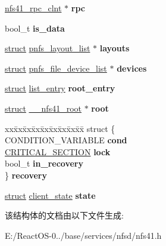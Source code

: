 \begin{DoxyCompactItemize}
\item 
\mbox{\label{struct____nfs41__client_a2b2d41615b81803ffdd4c105c84af7e6}} 
\hyperlink{struct____nfs41__rpc__clnt}{nfs41\+\_\+rpc\+\_\+clnt} $\ast$ {\bfseries rpc}
\item 
\mbox{\label{struct____nfs41__client_a7604f9288603a0123989c94c1efa1b97}} 
bool\+\_\+t {\bfseries is\+\_\+data}
\item 
\mbox{\label{struct____nfs41__client_ae9c265acfc3264bcb6ba53b9feccf64b}} 
\hyperlink{interfacestruct}{struct} \hyperlink{structpnfs__layout__list}{pnfs\+\_\+layout\+\_\+list} $\ast$ {\bfseries layouts}
\item 
\mbox{\label{struct____nfs41__client_a69a55cc04ccb6bcc3cfc9d58a0172e68}} 
\hyperlink{interfacestruct}{struct} \hyperlink{structpnfs__file__device__list}{pnfs\+\_\+file\+\_\+device\+\_\+list} $\ast$ {\bfseries devices}
\item 
\mbox{\label{struct____nfs41__client_a833a0b32460f73898c5a579d226e7938}} 
\hyperlink{interfacestruct}{struct} \hyperlink{structlist__entry}{list\+\_\+entry} {\bfseries root\+\_\+entry}
\item 
\mbox{\label{struct____nfs41__client_ad503a3b4ea87ba499ea973d0d9e018d5}} 
\hyperlink{interfacestruct}{struct} \hyperlink{struct____nfs41__root}{\+\_\+\+\_\+nfs41\+\_\+root} $\ast$ {\bfseries root}
\item 
\mbox{\label{struct____nfs41__client_aaa3c9a51bd6e15c00bc71811540bca05}} 
\begin{tabbing}
xx\=xx\=xx\=xx\=xx\=xx\=xx\=xx\=xx\=\kill
struct \{\\
\>CONDITION\_VARIABLE {\bfseries cond}\\
\>\hyperlink{struct___c_r_i_t_i_c_a_l___s_e_c_t_i_o_n}{CRITICAL\_SECTION} {\bfseries lock}\\
\>bool\_t {\bfseries in\_recovery}\\
\} {\bfseries recovery}\\

\end{tabbing}\item 
\mbox{\label{struct____nfs41__client_ac5ab27edc35c812923581775960fce32}} 
\hyperlink{interfacestruct}{struct} \hyperlink{structclient__state}{client\+\_\+state} {\bfseries state}
\end{DoxyCompactItemize}


该结构体的文档由以下文件生成\+:\begin{DoxyCompactItemize}
\item 
E\+:/\+React\+O\+S-\/0../base/services/nfsd/nfs41.\+h\end{DoxyCompactItemize}
